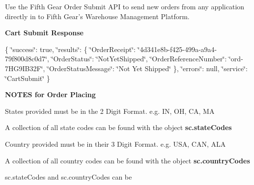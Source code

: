 Use the Fifth Gear Order Submit A\-P\-I to send new orders from any application directly in to Fifth Gear's Warehouse Management Platform. 


{\bfseries Cart Submit Response}

\{ \char`\"{}success\char`\"{}\-: true, \char`\"{}results\char`\"{}\-: \{ \char`\"{}\-Order\-Receipt\char`\"{}\-: \char`\"{}4d341e8b-\/f425-\/499a-\/a9a4-\/79f800d8c0d7\char`\"{}, \char`\"{}\-Order\-Status\char`\"{}\-: \char`\"{}\-Not\-Yet\-Shipped\char`\"{}, \char`\"{}\-Order\-Reference\-Number\char`\"{}\-: \char`\"{}ord-\/7\-H\-G9\-I\-B32\-F\char`\"{}, \char`\"{}\-Order\-Status\-Message\char`\"{}\-: \char`\"{}\-Not Yet Shipped\char`\"{} \}, \char`\"{}errors\char`\"{}\-: null, \char`\"{}service\char`\"{}\-: \char`\"{}\-Cart\-Submit\char`\"{} \}

{\bfseries N\-O\-T\-E\-S for Order Placing}


\begin{DoxyItemize}
\item States provided must be in the 2 Digit Format. e.\-g. I\-N, O\-H, C\-A, M\-A
\begin{DoxyItemize}
\item A collection of all state codes can be found with the object {\bfseries sc.\-state\-Codes}
\end{DoxyItemize}
\item Country provided must be in their 3 Digit Format. e.\-g. U\-S\-A, C\-A\-N, A\-L\-A
\item A collection of all country codes can be found with the object {\bfseries sc.\-country\-Codes}
\item sc.\-state\-Codes and sc.\-country\-Codes can be
\end{DoxyItemize}


